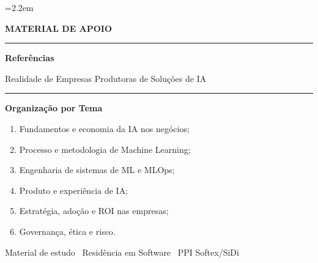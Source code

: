 \documentclass[11pt]{article}
\begin{document}
\color{textcol}
\emergencystretch=2.2em
\sloppy

\thispagestyle{empty}
\begin{center}
\vspace*{1.4cm}

\vspace{0.9cm}

{\displayfont\Large\bfseries\color{accent}MATERIAL DE APOIO}

\vspace{0.7cm}

{\color{line}\rule{0.75\linewidth}{0.8pt}}

\vspace{0.7cm}

{\displayfont\fontsize{40}{46}\selectfont\bfseries\color{textcol}Referências}

\vspace{0.5cm}

{\displayfont\Large\color{accent}Realidade de Empresas Produtoras de Soluções de IA}

\vspace{0.7cm}

{\color{line}\rule{0.75\linewidth}{0.8pt}}

\vspace{1.0cm}

\begin{tcolorbox}[enhanced,width=0.9\linewidth,colback=panel,colframe=line,
  boxrule=0.8pt,arc=4pt,left=18pt,right=18pt,top=14pt,bottom=14pt,
  borderline west={3pt}{0pt}{accent}]
  {\bfseries\color{accent}Organização por Tema}\par
  \vspace{6pt}
  \color{textcol}
  \begin{enumerate}[leftmargin=1.7em,itemsep=3.5pt,topsep=2pt]
    \item Fundamentos e economia da IA nos negócios;
    \item Processo e metodologia de Machine Learning;
    \item Engenharia de sistemas de ML e MLOps;
    \item Produto e experiência de IA;
    \item Estratégia, adoção e ROI nas empresas;
    \item Governança, ética e risco.
  \end{enumerate}
\end{tcolorbox}

\vfill
{\footnotesize\color{muted}Material de estudo \textcolor{line}{\textbar}\ Residência em Software \textcolor{line}{\textbar}\ PPI Softex/SiDi}
\vspace{0.6cm}
\end{center}
\end{document}
